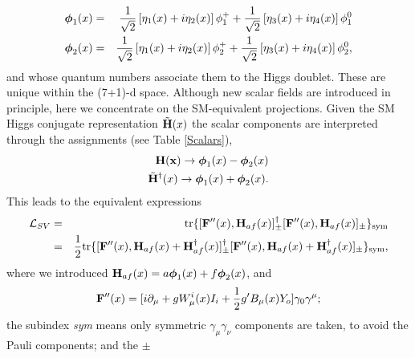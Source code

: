 \documentclass[12pt]{article}
\renewcommand\[{\begin{dmath}}
\renewcommand\]{\end{dmath}}
\newcommand{\boldmathphi}{\mbox{\boldmath$\phi$\unboldmath}}
\begin{document}
    \begin{eqnarray} \label{phibolddef}
 \boldsymbol{\phi}_1(x)& = & \frac{1}{\sqrt{2}} %
\left [ \eta_1(x)+i\eta_2(x)   \right ] \phi_{1}^{+} +
   \frac{1}{\sqrt{2}}  \left  [ \eta_3(x)+i\eta_4(x) \right ]   \phi_{1}^{0} \nonumber  \\
 { \boldmathphi}_2(x)
&=& \frac{1}{\sqrt{2}}
 \left [ \eta_1(x)+i\eta_2(x)   \right ] \phi_{2}^{+}
 + \frac{1}{\sqrt{2}}    \left  [ \eta_3(x)+i\eta_4(x) \right ]   \phi_{2}^{0}
 ,  \end{eqnarray}
  and   whose quantum numbers associate them to the Higgs doublet.  These are unique within the  (7+1)-d space\cite{Romero}. Although   new scalar fields are introduced in principle, here we concentrate on the SM-equivalent projections.
Given the SM Higgs    conjugate representation
$\tilde{\bf H}(x)$
 the   scalar components are interpreted    through the assignments (see Table \ref{Scalars}),
\begin{eqnarray}
\label {correspH}
 { \bf H(x)} \rightarrow \boldmathphi_1(x)-\boldmathphi_2(x) \nonumber \\
 \tilde{\bf H}^\dagger(x) \rightarrow\boldmathphi_1(x)+\boldmathphi_2(x).
\end{eqnarray}
This leads to the equivalent expressions
\begin{eqnarray}\label{EquivSV}
   {\cal L}_{SV}&=& { \rm tr  }\{[{\bf F''} (x) ,{\bf H}_{af}(x) ]_\pm^\dagger
[ {\bf F''} (x) ,{\bf H}_{af}(x)  ]_\pm \}_{\rm sym} \\
&=&  \frac{1}{2}  { \rm tr  }\{[{\bf F''}(x) ,{\bf H}_{af}(x)+ {\bf H}_{af}^\dagger(x) ]_\pm^\dagger
[ {\bf F''}(x) ,{\bf H}_{af}(x)+ {\bf H}_{af}^\dagger(x)  ]_\pm \}_{\rm sym}, \nonumber \\ \label{EquiSVHer}
\end{eqnarray}   where we
introduced ${\bf H}_{af}(x)=a\boldmathphi_1(x)+f \boldmathphi_2(x)$,  and  \begin{eqnarray}\label{Fpp}{\bf F''}(x)=
[i\partial_\mu+    {  g W_\mu^i(x) I_i} +\frac{1}{2}g' B_\mu(x) Y_o]\gamma_0 \gamma^\mu ; \end{eqnarray}   the subindex {\it sym} means only symmetric $\gamma_\mu \gamma_\nu$  components are taken, to avoid the Pauli components; and the  $\pm$
\end{document}
